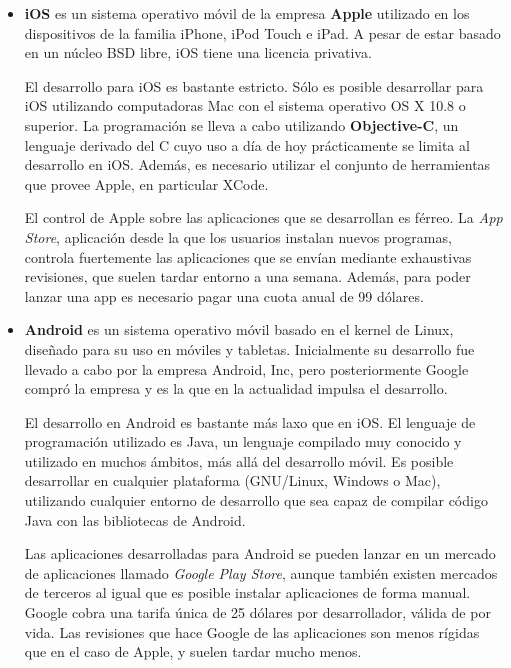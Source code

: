 \begin{itemize}
\item \textbf{iOS}\cite{ios} es un sistema operativo móvil de la empresa
  \textbf{Apple} utilizado en los dispositivos de la familia iPhone, iPod Touch
  e iPad. A pesar de estar basado en un núcleo \ac{BSD} libre, iOS tiene una
  licencia privativa.

  El desarrollo para iOS es bastante estricto. Sólo es posible desarrollar para
  iOS utilizando computadoras Mac con el sistema operativo OS X 10.8 o
  superior\cite{ios-development-requirements}. La programación se lleva a cabo
  utilizando \textbf{Objective-C}, un lenguaje derivado del C cuyo uso a día de
  hoy prácticamente se limita al desarrollo en iOS. Además, es necesario
  utilizar el conjunto de herramientas que provee Apple, en particular XCode.

  El control de Apple sobre las aplicaciones que se desarrollan es férreo. La
  \textit{App Store}, aplicación desde la que los usuarios instalan nuevos
  programas, controla fuertemente las aplicaciones que se envían mediante
  exhaustivas revisiones, que suelen tardar entorno a una semana. Además, para
  poder lanzar una app es necesario pagar una cuota anual de 99 dólares.

\item \textbf{Android}\cite{android} es un sistema operativo móvil basado en el
  kernel de Linux, diseñado para su uso en móviles y tabletas. Inicialmente su
  desarrollo fue llevado a cabo por la empresa Android, Inc, pero posteriormente
  Google compró la empresa y es la que en la actualidad impulsa el desarrollo.

  El desarrollo en Android es bastante más laxo que en iOS. El lenguaje de
  programación utilizado es Java, un lenguaje compilado muy conocido y utilizado
  en muchos ámbitos, más allá del desarrollo móvil. Es posible desarrollar en
  cualquier plataforma (GNU/Linux, Windows o Mac), utilizando cualquier entorno
  de desarrollo que sea capaz de compilar código Java con las bibliotecas de
  Android.

  Las aplicaciones desarrolladas para Android se pueden lanzar en un mercado de
  aplicaciones llamado \textit{Google Play Store}, aunque también existen
  mercados de terceros al igual que es posible instalar aplicaciones de forma
  manual. Google cobra una tarifa única de 25 dólares por desarrollador, válida
  de por vida. Las revisiones que hace Google de las aplicaciones son menos
  rígidas que en el caso de Apple, y suelen tardar mucho menos.


\end{itemize}
